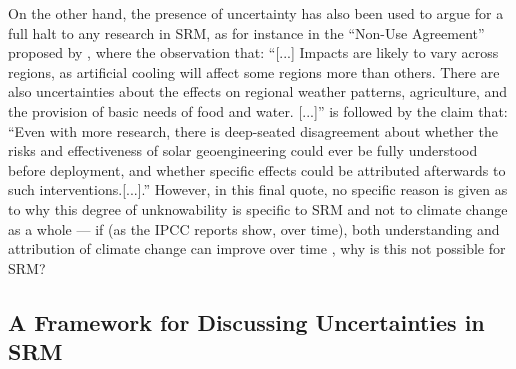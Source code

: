 \documentclass[draft]{agujournal2019}
\begin{document}
On the other hand, the presence of uncertainty has also been used to argue for a full halt to any research in SRM, as for instance in the ``Non-Use Agreement'' proposed by , where the observation that: ``[...] Impacts are likely to vary across regions, as artificial cooling will affect some regions more than others. There are also uncertainties about the effects on regional weather patterns, agriculture, and the provision of basic needs of food and water. [...]'' is followed by the claim that: ``Even with more research, there is deep-seated disagreement about whether the risks and effectiveness of solar geoengineering could ever be fully understood before deployment, and whether specific effects could be attributed afterwards to such interventions.[...].'' However, in this final quote, no specific reason is given as to why this degree of unknowability is specific to SRM and not to climate change as a whole --- if (as the IPCC reports show, over time), both understanding and attribution of climate change can improve over time \cite{IPCC_2021_WGI}, why is this not possible for SRM?

\subsection{A Framework for Discussing Uncertainties in SRM}
\end{document}
